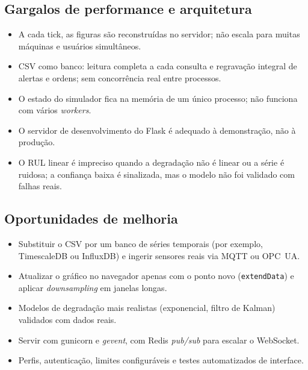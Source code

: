 \documentclass[12pt,a4paper]{article}
\newcommand{\codigo}[1]{\texttt{\small #1}}
\begin{document}
\subsection{Gargalos de performance e arquitetura}
\begin{itemize}
  \item A cada tick, as figuras são reconstruídas no servidor; não escala para muitas máquinas e usuários simultâneos.
  \item CSV como banco: leitura completa a cada consulta e regravação integral de alertas e ordens; sem concorrência real entre processos.
  \item O estado do simulador fica na memória de um único processo; não funciona com vários \emph{workers}.
  \item O servidor de desenvolvimento do Flask é adequado à demonstração, não à produção.
  \item O RUL linear é impreciso quando a degradação não é linear ou a série é ruidosa; a confiança baixa é sinalizada, mas o modelo não foi validado com falhas reais.
\end{itemize}

\subsection{Oportunidades de melhoria}
\begin{itemize}
  \item Substituir o CSV por um banco de séries temporais (por exemplo, TimescaleDB ou InfluxDB) e ingerir sensores reais via MQTT ou OPC~UA.
  \item Atualizar o gráfico no navegador apenas com o ponto novo (\codigo{extendData}) e aplicar \emph{downsampling} em janelas longas.
  \item Modelos de degradação mais realistas (exponencial, filtro de Kalman) validados com dados reais.
  \item Servir com gunicorn e \emph{gevent}, com Redis \emph{pub/sub} para escalar o WebSocket.
  \item Perfis, autenticação, limites configuráveis e testes automatizados de interface.
\end{itemize}

\end{document}
